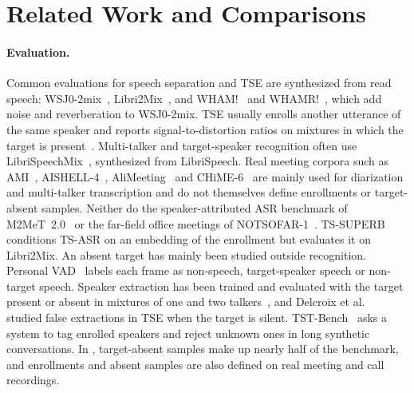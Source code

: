 
\section{Related Work and Comparisons}
\label{sec:related}

\paragraph{Evaluation.}
Common evaluations for speech separation and TSE are synthesized from read speech: WSJ0-2mix~\cite{hershey2016deep}, Libri2Mix~\cite{cosentino2020librimix}, and WHAM!~\cite{wichern2019wham} and WHAMR!~\cite{maciejewski2020whamr}, which add noise and reverberation to WSJ0-2mix.
TSE usually enrolls another utterance of the same speaker and reports signal-to-distortion ratios on mixtures in which the target is present~\cite{zmolikova2019speakerbeam, zmolikova2023neural}.
Multi-talker and target-speaker recognition often use LibriSpeechMix~\cite{kanda2020serialized}, synthesized from LibriSpeech.
Real meeting corpora such as AMI~\cite{carletta2005ami}, AISHELL-4~\cite{fu2021aishell4}, AliMeeting~\cite{yu2022m2met} and CHiME-6~\cite{watanabe2020chime6} are mainly used for diarization and multi-talker transcription and do not themselves define enrollments or target-absent samples.
Neither do the speaker-attributed ASR benchmark of M2MeT~2.0~\cite{liang2023second} or the far-field office meetings of NOTSOFAR-1~\cite{vinnikov2024notsofar}.
TS-SUPERB~\cite{peng2025tssuperb} conditions TS-ASR on an embedding of the enrollment but evaluates it on Libri2Mix.
An absent target has mainly been studied outside recognition.
Personal VAD~\cite{ding2020personal} labels each frame as non-speech, target-speaker speech or non-target speech.
Speaker extraction has been trained and evaluated with the target present or absent in mixtures of one and two talkers~\cite{borsdorf2021universal, zhang2023speaker}, and Delcroix et al.~\cite{delcroix2022listen} studied false extractions in TSE when the target is silent.
TST-Bench~\cite{lee2026who} asks a system to tag enrolled speakers and reject unknown ones in long synthetic conversations.
In \tsbench, target-absent samples make up nearly half of the benchmark, and enrollments and absent samples are also defined on real meeting and call recordings.

